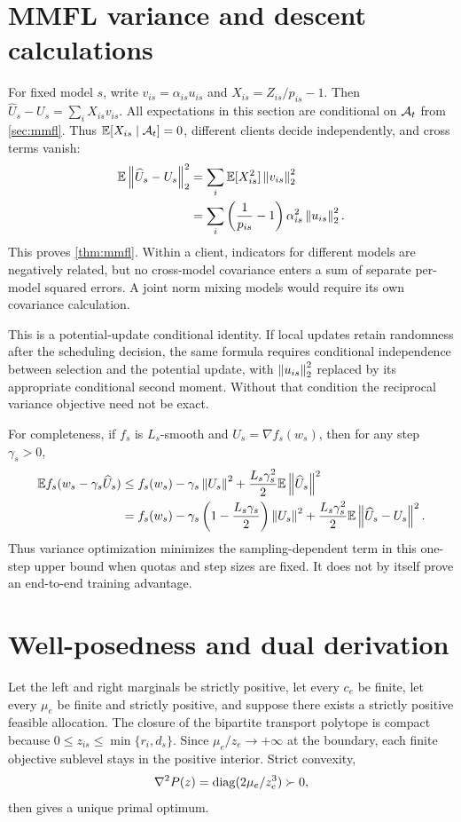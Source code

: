 \section{MMFL variance and descent calculations}
\label{app:mmfl}

For fixed model $s$, write $v_{is}=\alpha_{is}u_{is}$ and
$X_{is}=Z_{is}/p_{is}-1$.  Then
$\widehat U_s-U_s=\sum_iX_{is}v_{is}$.  All expectations in this section are
conditional on $\mathcal{A}_t$ from \cref{sec:mmfl}.  Thus
$\mathbb{E}[X_{is}\mid\mathcal{A}_t]=0$, different clients decide independently, and cross
terms vanish:
\begin{align}
 \mathbb{E}\left\lVert\widehat U_s-U_s\right\rVert_2^2
 &=\sum_i\mathbb{E}[X_{is}^2]\left\lVert v_{is}\right\rVert_2^2 \\
 &=\sum_i\left(\frac1{p_{is}}-1\right)
 \alpha_{is}^2\left\lVert u_{is}\right\rVert_2^2.
\end{align}
This proves \cref{thm:mmfl}.  Within a client, indicators for different models
are negatively related, but no cross-model covariance enters a sum of separate
per-model squared errors.  A joint norm mixing models would require its own
covariance calculation.

This is a potential-update conditional identity.  If local updates retain
randomness after the scheduling decision, the same formula requires
conditional independence between selection and the potential update, with
$\left\lVert u_{is}\right\rVert_2^2$ replaced by its appropriate conditional second moment.
Without that condition the reciprocal variance objective need not be exact.

For completeness, if $f_s$ is $L_s$-smooth and
$U_s=\nabla f_s(w_s)$, then for any step $\gamma_s>0$,
\begin{align}
 \mathbb{E} f_s(w_s-\gamma_s\widehat U_s)
 &\le f_s(w_s)-\gamma_s\left\lVert U_s\right\rVert^2
 +\frac{L_s\gamma_s^2}{2}\mathbb{E}\left\lVert\widehat U_s\right\rVert^2 \\
 &=f_s(w_s)-\gamma_s\left(1-\frac{L_s\gamma_s}{2}\right)
 \left\lVert U_s\right\rVert^2
 +\frac{L_s\gamma_s^2}{2}
 \mathbb{E}\left\lVert\widehat U_s-U_s\right\rVert^2.
\end{align}
Thus variance optimization minimizes the sampling-dependent term in this
one-step upper bound when quotas and step sizes are fixed.  It does not by itself
prove an end-to-end training advantage.

\section{Well-posedness and dual derivation}
\label{app:dual}

Let the left and right marginals be strictly positive, let every $c_e$ be
finite, let every $\mu_e$ be finite and strictly positive, and suppose there
exists a strictly positive feasible allocation.  The closure of the bipartite
transport polytope is compact because
$0\le z_{is}\le\min\{r_i,d_s\}$.  Since $\mu_e/z_e\to+\infty$ at the boundary,
each finite objective sublevel stays in the positive interior.  Strict convexity,
\begin{equation}
 \nabla^2P(z)=\operatorname{diag}(2\mu_e/z_e^3)\succ0,
\end{equation}
then gives a unique primal optimum.


